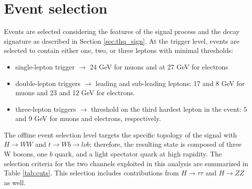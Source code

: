 \section{Event selection}

Events are selected considering the features of the signal process and the decay signature as described in Section \ref{sec:thq_sign}. At the trigger level, events are selected to contain either one, two, or three leptons with minimal \pt thresholds:
\begin{itemize}
\item single-lepton trigger $\to$ 24 GeV for muons and at 27 GeV for electrons
\item double-lepton triggers $\to$ leading and sub-leading leptons: 17 and 8 GeV for muons and 23 and 12 GeV for electrons.
\item three-lepton triggers $\to$ threshold on the third hardest lepton in the event: 5 and 9 GeV for muons and electrons, respectively.
\end{itemize}

The offline event selection level targets the specific topology of the \tHq signal with $H\to WW$ and $t \to Wb \to l\nu b$; therefore, the resulting state is composed of three W bosons, one $b$ quark, and a light spectator quark at high rapidity. The selection criteria for the two channels exploited in this analysis are summarized in Table \ref{tab:cuts}. This selection includes contributions from $H \to \tau\tau$ and $H\to ZZ$ as well.

